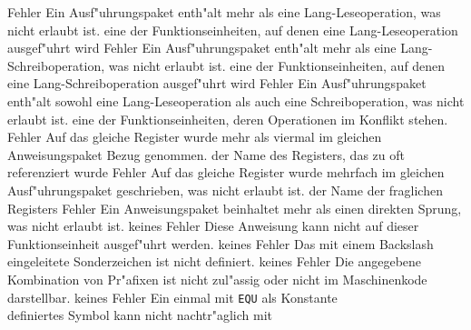 \documentclass[12pt,a4paper,twoside]{report}
\begin{document}
\begin{description}
               {Fehler}
               {Ein Ausf"uhrungspaket enth"alt mehr als eine
                Lang-Leseoperation, was nicht erlaubt ist.}
               {eine der Funktionseinheiten, auf denen eine
                Lang-Leseoperation ausgef"uhrt wird}
               {Fehler}
               {Ein Ausf"uhrungspaket enth"alt mehr als eine
                Lang-Schreiboperation, was nicht erlaubt ist.}
               {eine der Funktionseinheiten, auf denen eine
                Lang-Schreiboperation ausgef"uhrt wird}
               {Fehler}
               {Ein Ausf"uhrungspaket enth"alt sowohl eine
                Lang-Leseoperation als auch eine Schreiboperation,
                was nicht erlaubt ist.}
               {eine der Funktionseinheiten, deren Operationen im
                Konflikt stehen.}
               {Fehler}
               {Auf das gleiche Register wurde mehr als viermal im
                gleichen Anweisungspaket Bezug genommen.}
               {der Name des Registers, das zu oft referenziert wurde}
               {Fehler}
               {Auf das gleiche Register wurde mehrfach im gleichen
                Ausf"uhrungspaket geschrieben, was nicht erlaubt ist.}
               {der Name der fraglichen Registers}
               {Fehler}
               {Ein Anweisungspaket beinhaltet mehr als einen direkten
                Sprung, was nicht erlaubt ist.}
               {keines}
               {Fehler}
               {Diese Anweisung kann nicht auf dieser Funktionseinheit
                ausgef"uhrt werden.}
               {keines}
               {Fehler}
               {Das mit einem Backslash eingeleitete
	        Sonderzeichen ist nicht definiert.}
               {keines}
               {Fehler}
               {Die angegebene Kombination von Pr"afixen
	        ist nicht zul"assig oder nicht im
	        Maschinenkode darstellbar.}
               {keines}
               {Fehler}
               {Ein einmal mit {\tt EQU} als Konstante\\
                definiertes Symbol kann nicht nachtr"aglich mit\\
}
\end{description}
\end{document}
